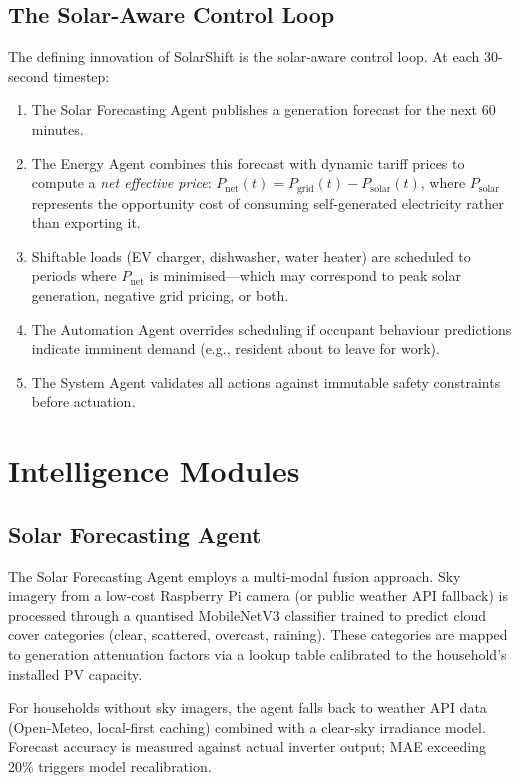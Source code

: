 \documentclass[11pt,a4paper]{article}
\begin{document}
\subsection{The Solar-Aware Control Loop}

The defining innovation of SolarShift is the solar-aware control loop. At each 30-second timestep:

\begin{enumerate}
    \item The Solar Forecasting Agent publishes a generation forecast for the next 60 minutes.
    \item The Energy Agent combines this forecast with dynamic tariff prices to compute a \textit{net effective price}: $P_{\text{net}}(t) = P_{\text{grid}}(t) - P_{\text{solar}}(t)$, where $P_{\text{solar}}$ represents the opportunity cost of consuming self-generated electricity rather than exporting it.
    \item Shiftable loads (EV charger, dishwasher, water heater) are scheduled to periods where $P_{\text{net}}$ is minimised---which may correspond to peak solar generation, negative grid pricing, or both.
    \item The Automation Agent overrides scheduling if occupant behaviour predictions indicate imminent demand (e.g., resident about to leave for work).
    \item The System Agent validates all actions against immutable safety constraints before actuation.
\end{enumerate}

\section{Intelligence Modules}
\label{sec:intelligence}

\subsection{Solar Forecasting Agent}

The Solar Forecasting Agent employs a multi-modal fusion approach. Sky imagery from a low-cost Raspberry Pi camera (or public weather API fallback) is processed through a quantised MobileNetV3 classifier trained to predict cloud cover categories (clear, scattered, overcast, raining). These categories are mapped to generation attenuation factors via a lookup table calibrated to the household's installed PV capacity.

For households without sky imagers, the agent falls back to weather API data (Open-Meteo, local-first caching) combined with a clear-sky irradiance model. Forecast accuracy is measured against actual inverter output; MAE exceeding 20\% triggers model recalibration.
\end{document}
